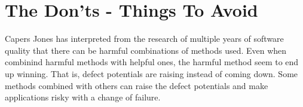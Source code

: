 



\section{The Don'ts - Things To Avoid}



Capers Jones has interpreted from the research of multiple years of software quality that there can be harmful combinations of methods used. Even when combinind harmful methods with helpful ones, the harmful method seem to end up winning. That is, defect potentials are raising instead of coming down. Some methods combined with others can raise the defect potentials and make applications risky with a change of failure.
